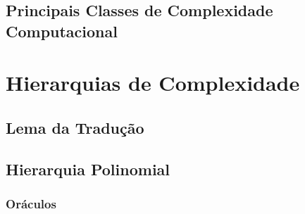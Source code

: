 
\subsection{Principais Classes de Complexidade Computacional}
\label{classes_complexidade}

\section{Hierarquias de Complexidade}

\subsection{Lema da Tradução}

\subsection{Hierarquia Polinomial}

\subsubsection{Oráculos}
